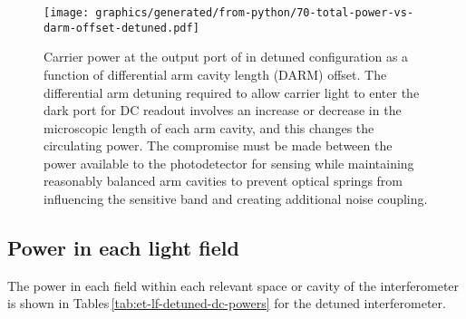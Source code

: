 \begin{figure}
  \centering
  \texttt{[image: graphics/generated/from-python/70-total-power-vs-darm-offset-detuned.pdf]}
  \caption[Carrier power at the output port of \ETLF{} in detuned configuration as a function of differential arm cavity offset]{\label{fig:total-power-vs-darm-offset-detuned}Carrier power at the output port of \ETLF{} in detuned configuration as a function of differential arm cavity length (\gls{DARM}) offset. The differential arm detuning required to allow carrier light to enter the dark port for \gls{DC} readout involves an increase or decrease in the microscopic length of each arm cavity, and this changes the circulating power. The compromise must be made between the power available to the photodetector for sensing while maintaining reasonably balanced arm cavities to prevent optical springs from influencing the sensitive band and creating additional noise coupling.}
\end{figure}

\subsection{Power in each light field}
The power in each field within each relevant space or cavity of the interferometer is shown in Tables\,\ref{tab:et-lf-detuned-dc-powers} for the detuned interferometer.


